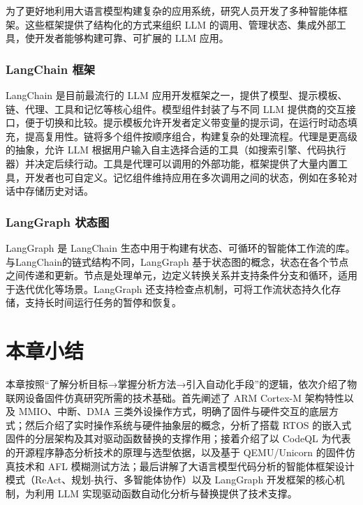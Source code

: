 为了更好地利用大语言模型构建复杂的应用系统，研究人员开发了多种智能体框架。这些框架提供了结构化的方式来组织 LLM 的调用、管理状态、集成外部工具，使开发者能够构建可靠、可扩展的 LLM 应用。

\subsubsection{LangChain 框架}

LangChain 是目前最流行的 LLM 应用开发框架之一，提供了模型、提示模板、链、代理、工具和记忆等核心组件。模型组件封装了与不同 LLM 提供商的交互接口，便于切换和比较。提示模板允许开发者定义带变量的提示词，在运行时动态填充，提高复用性。链将多个组件按顺序组合，构建复杂的处理流程。代理是更高级的抽象，允许 LLM 根据用户输入自主选择合适的工具（如搜索引擎、代码执行器）并决定后续行动。工具是代理可以调用的外部功能，框架提供了大量内置工具，开发者也可自定义。记忆组件维持应用在多次调用之间的状态，例如在多轮对话中存储历史对话。

\subsubsection{LangGraph 状态图}

LangGraph 是 LangChain 生态中用于构建有状态、可循环的智能体工作流的库。与LangChain的链式结构不同，LangGraph 基于状态图的概念，状态在各个节点之间传递和更新。节点是处理单元，边定义转换关系并支持条件分支和循环，适用于迭代优化等场景。LangGraph 还支持检查点机制，可将工作流状态持久化存储，支持长时间运行任务的暂停和恢复。

\section{本章小结}
\label{sec:bg_summary}

本章按照“了解分析目标→掌握分析方法→引入自动化手段”的逻辑，依次介绍了物联网设备固件仿真研究所需的技术基础。首先阐述了 ARM Cortex-M 架构特性以及 MMIO、中断、DMA 三类外设操作方式，明确了固件与硬件交互的底层方式；然后介绍了实时操作系统与硬件抽象层的概念，分析了搭载 RTOS 的嵌入式固件的分层架构及其对驱动函数替换的支撑作用；接着介绍了以 CodeQL 为代表的开源程序静态分析技术的原理与选型依据，以及基于 QEMU/Unicorn 的固件仿真技术和 AFL 模糊测试方法；最后讲解了大语言模型代码分析的智能体框架设计模式（ReAct、规划-执行、多智能体协作）以及 LangGraph 开发框架的核心机制，为利用 LLM 实现驱动函数自动化分析与替换提供了技术支撑。

